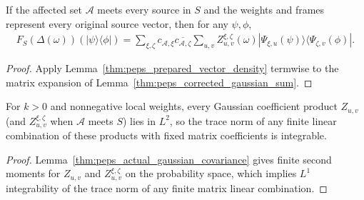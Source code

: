 \begin{lemma}
    \label{thm:peps_gaussian_vector_density}
    \leanok
    If the affected set $\mathcal A$ meets every source in $S$ and the weights
    and frames represent every original source vector, then for any $\psi,\phi$,
    \begin{align}
        F_S(\Delta(\omega))(|\psi\rangle\langle\phi|)
        =\sum_{\xi,\zeta}c_{\mathcal A,\xi}\overline{c_{\mathcal A,\zeta}}
        \sum_{u,v}Z^{\xi,\zeta}_{u,v}(\omega)
        |\Psi_{\xi,u}(\psi)\rangle\langle\Psi_{\zeta,v}(\phi)|.
        \label{eq:peps_gaussian_vector_density}
    \end{align}
\end{lemma}

\begin{proof}\leanok
    Apply Lemma~\ref{thm:peps_prepared_vector_density} termwise to the matrix
    expansion of Lemma~\ref{thm:peps_corrected_gaussian_sum}.
\end{proof}

\begin{lemma}
    \label{thm:peps_gaussian_products_integrable}
    \leanok
    For $k>0$ and nonnegative local weights, every Gaussian coefficient product
    $Z_{u,v}$ (and $Z^{\xi,\zeta}_{u,v}$ when $\mathcal A$ meets $S$) lies in
    $L^2$, so the trace norm of any finite linear combination of these products
    with fixed matrix coefficients is integrable.
\end{lemma}

\begin{proof}\leanok
    Lemma~\ref{thm:peps_actual_gaussian_covariance} gives finite second moments
    for $Z_{u,v}$ and $Z^{\xi,\zeta}_{u,v}$ on the probability space, which
    implies $L^1$ integrability of the trace norm of any finite matrix linear
    combination.
\end{proof}

